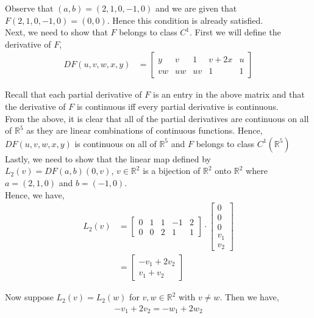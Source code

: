 \documentclass[12pt]{article}
\begin{document}
Observe that $(a, b) = (2, 1, 0, -1, 0)$ and we are given that $F(2, 1, 0, -1, 0) = (0, 0)$. Hence this condition is already satisfied.\\

Next, we need to show that $F$ belongs to class $C^1$. First we will define the derivative of $F$,
\begin{align*}
DF(u, v, w, x, y) &= \begin{bmatrix}
y & v & 1 & v + 2x & u\\
vw & uw & uv & 1 & 1
\end{bmatrix}
\end{align*}

Recall that each partial derivative of $F$ is an entry in the above matrix and that the derivative of $F$ is continuous iff every partial derivative is continuous.\\

From the above, it is clear that all of the partial derivatives are continuous on all of $\mathbb{R}^5$ as they are linear combinations of continuous functions. Hence, $DF(u, v, w, x, y)$ is continuous on all of $\mathbb{R}^5$ and $F$ belongs to class $C^1(\mathbb{R}^5)$\\

Lastly, we need to show that the linear map defined by $L_2(v) = DF(a, b)(0, v)$, $v \in \mathbb{R}^2$ is a bijection of $\mathbb{R}^2$ onto $\mathbb{R}^2$ where $a = (2, 1, 0)$ and $b = (-1, 0)$.\\

Hence, we have,
\begin{align*}
L_2(v) &= \begin{bmatrix}
0 & 1 & 1 & -1 & 2\\
0 & 0 & 2 & 1 & 1
\end{bmatrix} \cdot \begin{bmatrix}
0 \\ 0 \\ 0 \\ v_1 \\ v_2
\end{bmatrix}\\
&= \begin{bmatrix}
-v_1 + 2v_2 \\
v_1 + v_2
\end{bmatrix}
\end{align*}

Now suppose $L_2(v) = L_2(w)$ for $v, w \in \mathbb{R}^2$ with $v \neq w$. Then we have,
\begin{align*}
-v_1 + 2v_2 = -w_1 + 2w_2
\end{align*}
\end{document}
